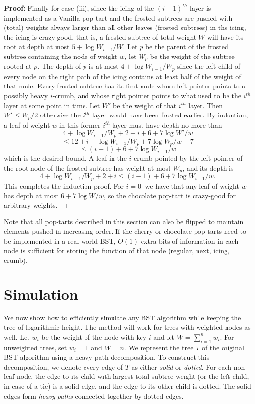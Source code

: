 \documentclass[11pt]{article}
\newenvironment{proof}{\noindent\textbf{Proof: }\ignorespaces}
  {\hspace*{\fill}$\Box$\medskip}
\begin{document}
\begin{proof}
Finally for case (iii), since the icing of the $(i-1)^{th}$ layer is
implemented as a Vanilla pop-tart and the frosted subtrees are pushed
with (total) weights always larger than all other leaves (frosted
subtrees) in the icing, the icing is crazy good, that is, a frosted
subtree of total weight $W$ will have its root at depth at most 
$5+\log {W_{i-1}/W}$. 
Let $p$ be the parent of the frosted subtree containing the node of
weight $w$, let $W_p$ be the
weight of the subtree rooted at $p$. The depth of $p$ is at most 
$4+\log {W_{i-1}/W_p}$ since the left child of every node on the right
path of the icing contains at least half of the weight of that node.  
Every frosted subtree has its first node whose left pointer points to
a possibly heavy $i$-crumb, and whose right pointer points to what
used to be the $i^{th}$ layer at some point in time. Let $W'$ be the
weight of that $i^{th}$ layer. Then $W' \leq W_p/2$ otherwise the
$i^{th}$ layer would have been frosted earlier. 
By induction, a leaf of weight $w$ in this former $i^{th}$ layer must
have depth no more than 
$$4+\log {W_{i-1}/W_p} + 2 + i + 6 + 7\log {W'/w} $$
$$\leq 12 + i + \log {W_{i-1}/W_p} + 7\log {W_p/w} - 7$$
$$\leq (i-1) + 6 + 7\log{W_{i-1}/w}$$
which is the desired bound. 
A leaf in the $i$-crumb pointed by the left pointer of the root node
of the frosted subtree has weight at most $W_p$, and its depth is
$$4+\log {W_{i-1}/W_p} + 2+ i 
\leq   (i-1) + 6 + 7\log{W_{i-1}/w}.$$
This completes the induction proof. For $i=0$, we have that any leaf
of weight $w$ has depth at most $6+7\log{W/w}$, so the chocolate
pop-tart is crazy-good for arbitrary weights. 
\end{proof}

Note that all pop-tarts described in this section can also be flipped
to maintain elements pushed in increasing order. If the cherry or
chocolate pop-tarts need to be implemented in a real-world BST,
$O(1)$ extra bits of information in each node is sufficient
for storing the function of that node (regular, next, icing, crumb). 

\section{Simulation}\label{sec:simulation}
We now show how to efficiently simulate any BST algorithm while keeping
the tree of logarithmic height. The method will work for trees with
weighted nodes as well. Let $w_i$ be the weight of the node with key $i$
and let $W=\sum_{i=1}^n w_i$.  For unweighted trees, set $w_i=1$ and
$W=n$.  We represent the tree $T$ of the original BST algorithm using a
heavy path decomposition. To construct this decomposition, we denote
every edge of $T$ as either \emph{solid} or \emph{dotted}. For each
non-leaf node, the edge to its child with largest total subtree weight
(or the left child, in case of a tie) is a solid edge, and the edge to
its other child is dotted. The solid edges form \emph{heavy paths}
connected together by dotted edges.
\end{document}
